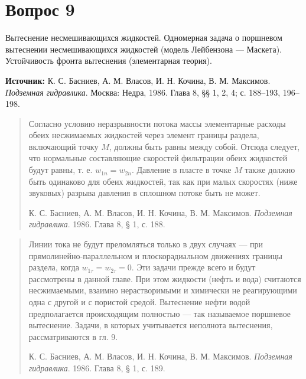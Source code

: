 \documentclass[12pt,a4paper]{article}
\begin{document}
\section*{Вопрос 9}
Вытеснение несмешивающихся жидкостей. Одномерная задача о поршневом вытеснении несмешивающихся жидкостей (модель Лейбензона — Маскета). Устойчивость фронта вытеснения (элементарная теория).

\medskip
\noindent\textbf{Источник:} К. С. Басниев, А. М. Власов, И. Н. Кочина, В. М. Максимов. \textit{Подземная гидравлика}. Москва: Недра, 1986. Глава 8, §§ 1, 2, 4; с. 188--193, 196--198.
\par\bigskip
\begin{quote}\sloppy
Согласно условию неразрывности потока массы элементарные расходы обеих несжимаемых жидкостей через элемент границы раздела, включающий точку $M$, должны быть равны между собой. Отсюда следует, что нормальные составляющие скоростей фильтрации обеих жидкостей будут равны, т. е. $w_{1n}=w_{2n}$. Давление в пласте в точке $M$ также должно быть одинаково для обеих жидкостей, так как при малых скоростях (ниже звуковых) разрыва давления в сплошном потоке быть не может.
\par\nobreak\smallskip
{\small К. С. Басниев, А. М. Власов, И. Н. Кочина, В. М. Максимов. \textit{Подземная гидравлика}. 1986. Глава 8, § 1, с. 188.}\par
\end{quote}

\begin{quote}\sloppy
Линии тока не будут преломляться только в двух случаях --- при прямолинейно-параллельном и плоскорадиальном движениях границы раздела, когда $w_{1\tau}=w_{2\tau}=0$. Эти задачи прежде всего и будут рассмотрены в данной главе. При этом жидкости (нефть и вода) считаются несжимаемыми, взаимно нерастворимыми и химически не реагирующими одна с другой и с пористой средой. Вытеснение нефти водой предполагается происходящим полностью --- так называемое поршневое вытеснение. Задачи, в которых учитывается неполнота вытеснения, рассматриваются в гл. 9.
\par\nobreak\smallskip
{\small К. С. Басниев, А. М. Власов, И. Н. Кочина, В. М. Максимов. \textit{Подземная гидравлика}. 1986. Глава 8, § 1, с. 189.}\par
\end{quote}
\end{document}

